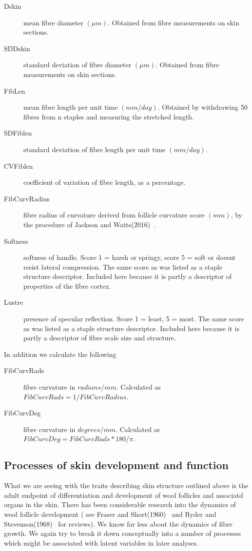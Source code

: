 \documentclass[titlepage]{article}  %
\begin{document}
\begin{description}
\item[Dskin] mean fibre diameter $(\mu m)$. Obtained from fibre measurements on skin sections.
\item[SDDskin] standard deviation of fibre diameter $(\mu m)$. Obtained from fibre measurements on skin sections.
\item[FibLen] mean fibre length per unit time $(mm/day)$. Obtained by withdrawing 50 fibres from n staples and measuring the stretched length.
\item[SDFiblen] standard deviation of fibre length per unit time $(mm/day)$.
\item[CVFiblen] coefficient of variation of fibre length, as a percentage.
\item[FibCurvRadius] fibre radius of curvature derived from follicle curvature score $(mm)$, by the procedure of Jackson and Watts(2016)~\cite{jack:16b}.
\item[Softness] softness of handle. Score 1 = harsh or springy, score 5 = soft or doesnt resist lateral compression. The same score as was listed as a staple structure descriptor. Included here because it is partly a descriptor of properties of the fibre cortex.
\item[Lustre] presence of specular reflection. Score 1 = least, 5 = most. The same score as was listed as a staple structure descriptor. Included here because it is partly a descriptor of fibre scale size and structure.
\end{description}
In addition we calculate the following 
\begin{description}
\item[FibCurvRads] fibre curvature in $radians/mm$. Calculated as $FibCurvRads = 1/FibCurvRadius$.
\item[FibCurvDeg] fibre curvature in $degrees/mm$. Calculated as $FibCurvDeg = FibCurvRads * 180/\pi$.
\end{description}


\subsection{Processes of skin development and function}
What we are seeing with the traits describing skin structure outlined above is the adult endpoint of differentiation and development of wool follicles and associatd organs in the skin. There has been considerable research into the dynamics of wool follicle development ( see Fraser and Short(1960)~\cite{fras:60} and Ryder and Stevenson(1968)~\cite{ryde:68} for reviews). We know far less about the dynamics of fibre growth. We again try to break it down conceptually into a number of processes which might be associated with latent variables in later analyses.
\end{document}
